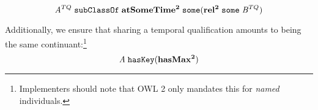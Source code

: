 \begin{equation}
\mathit{A}^{TQ}\;\mathtt{subClassOf}\;\mathrm{\mathbf{atSomeTime^2}}\;\mathtt{some
(}\mathrm{\mathbf{rel^2}}\;\mathtt{some}\;\mathit{B}^{TQ})
\label{eq:tqc:temp}
\end{equation}

Additionally, we ensure that sharing a temporal qualification amounts to being
the same continuant:\footnote{Implementers should note that OWL 2 only mandates
this for \emph{named} individuals.}
\begin{equation}
\mathit{A}\;\mathtt{hasKey}(\mathrm{\mathbf{hasMax^2}})
\end{equation}





%

%


